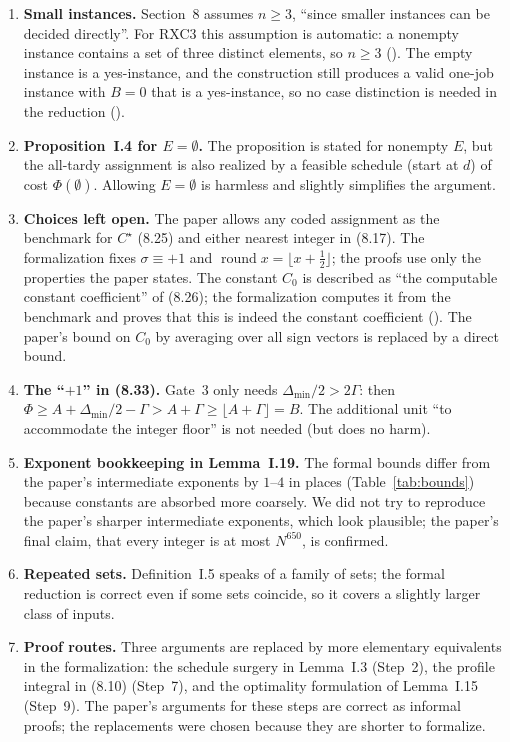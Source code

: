 \documentclass[11pt]{article}
\DeclareMathOperator{\round}{round}
\begin{document}
\begin{enumerate}[leftmargin=20pt,itemsep=5pt]
\item \textbf{Small instances.} Section~8 assumes $n\ge3$, ``since smaller instances can be
  decided directly''. For RXC3 this assumption is automatic: a nonempty instance contains a
  set of three distinct elements, so $n\ge3$ (). The empty instance
  is a yes-instance, and the construction still produces a valid one-job instance with $B=0$
  that is a yes-instance, so no case distinction is needed in the reduction
  ().
\item \textbf{Proposition~I.4 for $E=\emptyset$.} The proposition is stated for nonempty $E$,
  but the all-tardy assignment is also realized by a feasible schedule (start at $d$) of cost
  $\Phi(\emptyset)$. Allowing $E=\emptyset$ is harmless and slightly simplifies the
  argument.
\item \textbf{Choices left open.} The paper allows any coded assignment as the benchmark for
  $C^\star$ (8.25) and either nearest integer in (8.17). The formalization fixes $\sigma\equiv+1$
  and $\round x=\lfloor x+\frac12\rfloor$; the proofs use only the properties the paper
  states. The constant $C_0$ is described as ``the computable constant coefficient'' of (8.26);
  the formalization computes it from the benchmark and proves that this is indeed the constant
  coefficient (). The paper's bound on $C_0$ by averaging over all sign
  vectors is replaced by a direct bound.
\item \textbf{The ``$+1$'' in (8.33).} Gate~3 only needs $\Delta_{\min}/2>2\Gamma$: then
  $\Phi\ge A+\Delta_{\min}/2-\Gamma>A+\Gamma\ge\lfloor A+\Gamma\rfloor=B$. The additional unit
  ``to accommodate the integer floor'' is not needed (but does no harm).
\item \textbf{Exponent bookkeeping in Lemma~I.19.} The formal bounds differ from the paper's
  intermediate exponents by $1$--$4$ in places (Table~\ref{tab:bounds}) because constants are
  absorbed more coarsely. We did not try to reproduce the paper's sharper intermediate
  exponents, which look plausible; the paper's final claim, that every integer is at most
  $N^{650}$, is confirmed.
\item \textbf{Repeated sets.} Definition~I.5 speaks of a family of sets; the formal reduction is
  correct even if some sets coincide, so it covers a slightly larger class of inputs.
\item \textbf{Proof routes.} Three arguments are replaced by more elementary equivalents in the
  formalization: the schedule surgery in Lemma~I.3 (Step~2), the profile integral in (8.10)
  (Step~7), and the optimality formulation of Lemma~I.15 (Step~9). The paper's arguments for
  these steps are correct as informal proofs; the replacements were chosen because they are
  shorter to formalize.
\end{enumerate}
\end{document}
